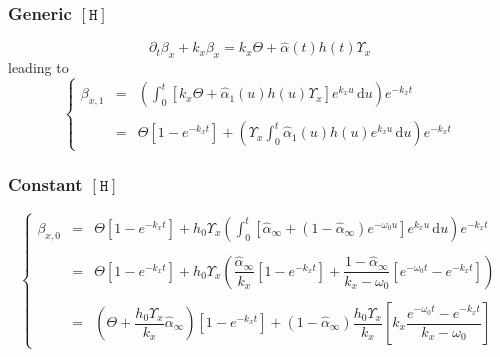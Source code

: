 \documentclass[aps,onecolumn,12pt]{revtex4}
\newcommand{\mychem}[1]{\mathtt{#1}}
\newcommand{\myconc}[1]{\left\lbrack{#1}\right\rbrack}
\newcommand{\spproton}{\mychem{H}}
\newcommand{\proton}{\myconc{\spproton}}
\begin{document}
\subsubsection{Generic $\proton$}
\begin{equation}
\partial_t\beta_x + k_x \beta_x = k_x\Theta + \hat{\alpha}(t)h(t) \Upsilon_x
\end{equation}
leading to
\begin{equation}
\left\lbrace
\begin{array}{rcl}
\beta_{x,1} & = & \displaystyle \left( \int_0^t \left[k_x\Theta + \hat{\alpha}_1(u)h(u) \Upsilon_x \right]e^{k_xu}\,\mathrm{d}u \right) e^{-k_x t}\\
\\
 & = & \displaystyle \Theta \left[1-e^{-k_xt}\right] + \left(\Upsilon_x \int_0^t \hat{\alpha}_1(u)h(u) e^{k_xu}\,\mathrm{d}u \right)  e^{-k_x t}
\end{array}
\right.
\end{equation}

\subsubsection{Constant $\proton$}
\begin{equation}
\left\lbrace
\begin{array}{rcl}
\beta_{x,0} & = & \displaystyle \Theta \left[1-e^{-k_xt}\right] +h_0 \Upsilon_x
\left( \int_0^t \left[\hat\alpha_\infty + \left(1-\hat\alpha_\infty\right) e^{-\omega_0 u} \right]e^{k_xu} \,\mathrm{d}u \right) e^{-k_x t} \\
\\
& = & \displaystyle \Theta \left[1-e^{-k_xt}\right] +
h_0 \Upsilon_x 
	\left( 
		\dfrac{\hat\alpha_\infty}{k_x}\left[1-e^{-k_xt}\right]  
		+ \dfrac{1-\hat\alpha_\infty}{k_x - \omega_0}\left[e^{-\omega_0t} - e^{-k_xt}\right]
	\right)\\
\\
& = & \left(\Theta+\dfrac{h_0\Upsilon_x}{k_x} \hat{\alpha}_\infty\right) \left[1-e^{-k_xt}\right] + (1-\hat\alpha_\infty) \dfrac{h_0\Upsilon_x}{k_x} \left[ k_x \dfrac{e^{-\omega_0t} - e^{-k_xt}}{k_x - \omega_0}\right]
\end{array}
\right.
\end{equation}
\end{document}
